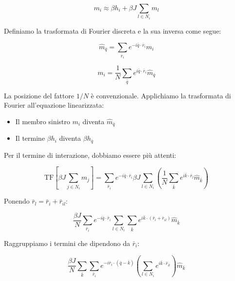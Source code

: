 \begin{equation} \label{eq:ch19_10}
m_i \approx \beta h_i + \beta J \sum_{l \in N_i} m_l
\end{equation}

Definiamo la trasformata di Fourier discreta e la sua inversa come segue:

\begin{equation} \label{eq:ch19_11}
\hat{m}_{\bar{q}} = \sum_{\bar{r}_i} e^{-i\bar{q}\cdot\bar{r}_i} m_i
\end{equation}

\begin{equation} \label{eq:ch19_12}
m_i = \frac{1}{N} \sum_{\bar{q}} e^{i\bar{q}\cdot\bar{r}_i} \hat{m}_{\bar{q}}
\end{equation}

La posizione del fattore $1/N$ è convenzionale.
Applichiamo la trasformata di Fourier all'equazione linearizzata:
\begin{itemize}
    \item Il membro sinistro $m_i$ diventa $\hat{m}_{\bar{q}}$
    \item Il termine $\beta h_i$ diventa $\beta \hat{h}_{\bar{q}}$
\end{itemize}

Per il termine di interazione, dobbiamo essere più attenti:

\begin{equation} \label{eq:ch19_13}
\text{TF}\left[\beta J \sum_{j \in N_i} m_j\right] = \sum_{\bar{r}_i} e^{-i\bar{q}\cdot\bar{r}_i} \beta J \sum_{l \in N_i} \left(\frac{1}{N} \sum_{\bar{k}} e^{i\bar{k}\cdot\bar{r}_l} \hat{m}_{\bar{k}}\right)
\end{equation}

Ponendo $\bar{r}_l = \bar{r}_i + \bar{r}_{il}$:

\begin{equation} \label{eq:ch19_14}
\frac{\beta J}{N} \sum_{\bar{r}_i} e^{-i\bar{q}\cdot\bar{r}_i} \sum_{l \in N_i} \sum_{\bar{k}} e^{i\bar{k}\cdot(\bar{r}_i + \bar{r}_{il})} \hat{m}_{\bar{k}}
\end{equation}

Raggruppiamo i termini che dipendono da $\bar{r}_i$:

\begin{equation} \label{eq:ch19_15}
\frac{\beta J}{N} \sum_{\bar{k}} \sum_{\bar{r}_i} e^{-i\bar{r}_i \cdot (\bar{q}-\bar{k})} \left( \sum_{l \in N_i} e^{i\bar{k}\cdot\bar{r}_{il}} \right) \hat{m}_{\bar{k}}
\end{equation}


